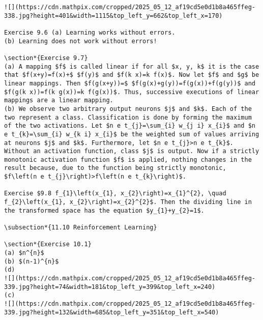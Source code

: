 \documentclass[10pt]{article}
\begin{document}
\begin{verbatim}
![](https://cdn.mathpix.com/cropped/2025_05_12_af19cd5e0d1b8a465ffeg-338.jpg?height=401&width=1115&top_left_y=662&top_left_x=170)

Exercise 9.6 (a) Learning works without errors.
(b) Learning does not work without errors!

\section*{Exercise 9.7}
(a) A mapping $f$ is called linear if for all $x, y, k$ it is the case that $f(x+y)=f(x)+$ $f(y)$ and $f(k x)=k f(x)$. Now let $f$ and $g$ be linear mappings. Then $f(g(x+y))=$ $f(g(x)+g(y))=f(g(x))+f(g(y))$ and $f(g(k x))=f(k g(x))=k f(g(x))$. Thus, successive executions of linear mappings are a linear mapping.
(b) We observe two arbitrary output neurons $j$ and $k$. Each of the two represent a class. Classification is done by forming the maximum of the two activations. Let $n e t_{j}=\sum_{i} w_{j i} x_{i}$ and $n e t_{k}=\sum_{i} w_{k i} x_{i}$ be the weighted sum of values arriving at neurons $j$ and $k$. Furthermore, let $n e t_{j}>n e t_{k}$. Without an activation function, class $j$ is output. Now if a strictly monotonic activation function $f$ is applied, nothing changes in the result because, due to the function being strictly monotonic, $f\left(n e t_{j}\right)>f\left(n e t_{k}\right)$.

Exercise $9.8 f_{1}\left(x_{1}, x_{2}\right)=x_{1}^{2}, \quad f_{2}\left(x_{1}, x_{2}\right)=x_{2}^{2}$. Then the dividing line in the transformed space has the equation $y_{1}+y_{2}=1$.

\subsection*{11.10 Reinforcement Learning}

\section*{Exercise 10.1}
(a) $n^{n}$
(b) $(n-1)^{n}$
(d)
![](https://cdn.mathpix.com/cropped/2025_05_12_af19cd5e0d1b8a465ffeg-339.jpg?height=74&width=181&top_left_y=399&top_left_x=240)
(c)
![](https://cdn.mathpix.com/cropped/2025_05_12_af19cd5e0d1b8a465ffeg-339.jpg?height=132&width=685&top_left_y=351&top_left_x=540)


\end{verbatim}
\end{document}
